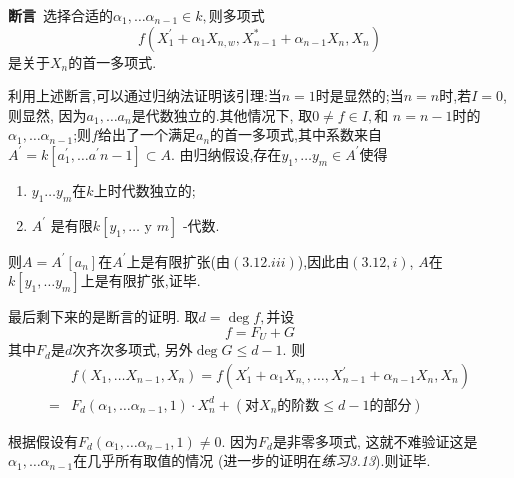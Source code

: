 \documentclass[UTF8]{book}
\begin{document}
		
		\textbf{断言}\ 选择合适的$\alpha_{1}, \dots \alpha_{n-1} \in k,$则多项式
		\begin{equation*}
		f \left(X _{1}^{\prime}+\alpha_{1} X _{ n , w }, X _{ n -1}^{*}+\alpha_{ n -1} X _{ n }, X _{ n }\right)
		\end{equation*}
		是关于$X _{ n }$的首一多项式.
		
		
		利用上述断言,可以通过归纳法证明该引理:当$ n = 1 $时是显然的;当$ n = n $时,若$I=0$,则显然, 因为$a_{1}, \dots a_{n}$是代数独立的.其他情况下, 取$0 \neq f \in I,$和 $ n = n-1 $时的$\alpha_{1}, \ldots \alpha_{n-1}$;则$f$给出了一个满足$ a_{n} $的首一多项式,其中系数来自$A ^{\prime}= k \left[ a _{1}^{\prime}, \ldots a ^{\prime} n -1\right] \subset A .$ 由归纳假设,存在$y_{1}, \dots y_{m} \in A^{\prime}$使得
		
		\begin{enumerate}[(1)]
			\item $y _{1} \ldots y _{ m }$在$k$上时代数独立的;
			\item $A^{\prime}$ 是有限$k \left[y_{1}, \dots \text { y } m \right]$ -代数.
		\end{enumerate}
		
		
		则$A = A ^{\prime}\left[ a _{ n }\right]$在$A ^{\prime}$上是有限扩张(由$ (3.12.iii) $),因此由$(3.12, i )$, $ A $在$k \left[ y _{1}, \ldots y _{ m }\right]$上是有限扩张,证毕.
		
		
		
		最后剩下来的是断言的证明. 取$d =\operatorname{deg} f ,$并设
		\begin{equation*}
		f = F _{ U }+ G
		\end{equation*}
		其中$F _{ d }$是$d$次齐次多项式, 另外$\operatorname{deg} G \leq d -1 .$ 则
		\begin{equation*}
		\begin{split}
		&f\left(X_{1}, \dots X_{n-1}, X_{n}\right)=f\left(X_{1}^{\prime}+\alpha_{1} X_{n, },\ldots, X_{n-1}^{\prime}+\alpha_{n-1} X_{n}, X_{n}\right)\\
		=&F _{ d }\left(\alpha_{1}, \ldots \alpha_{n-1}, 1\right) \cdot X _{ n }^{d} +\left(\text {对} X _{ n } \text {的阶数} \leq d -1\text{的部分}\right)
		\end{split}
		\end{equation*}
		
		根据假设有$F _{ d }\left(\alpha_{1}, \ldots \alpha_{ n -1}, 1\right) \neq 0 .$ 因为$F _{ d }$是非零多项式, 这就不难验证这是 $\alpha_{1}, \ldots \alpha_{n-1}$在几乎所有取值的情况 (进一步的证明在\textit{练习3.13}).则证毕.
		
\end{document}
